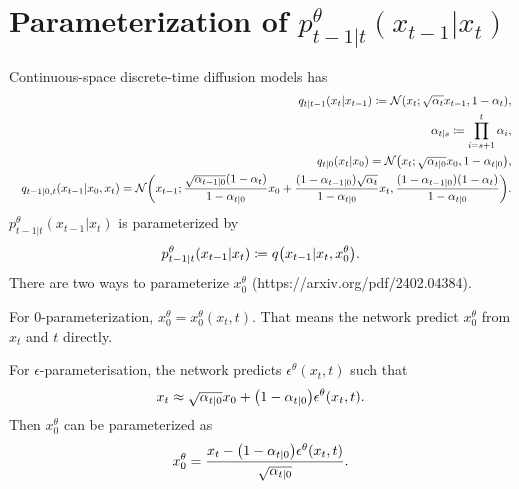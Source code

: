 \documentclass[10pt]{article}
\begin{document}
\section{Parameterization of $p^\theta_{t-1|t}(x_{t-1}|x_t)$}

Continuous-space discrete-time diffusion models has
\begin{eqnarray*}
  &&q_{t|t-1}(x_t|x_{t-1})\coloneq\mathcal{N}\qty(x_t;\sqrt{\alpha_t}x_{t-1}, 1-\alpha_t),\\
  &&\alpha_{t|s}\coloneq\prod_{i=s+1}^t \alpha_i,\\
  &&q_{t|0}(x_t|x_0)=\mathcal{N}\qty(x_t;\sqrt{\alpha_{t|0}}x_0, 1-\alpha_{t|0}),\\
  &&q_{t-1|0,t}(x_{t-1}|x_0,x_t)=\mathcal{N}\qty(x_{t-1};\frac{\sqrt{\alpha_{t-1|0}}(1-\alpha_t)}{1-\alpha_{t|0}}x_0 + \frac{(1-\alpha_{t-1|0})\sqrt{\alpha_t}}{1-\alpha_{t|0}}x_t, \frac{(1-\alpha_{t-1|0})(1-\alpha_t)}{1-\alpha_{t|0}}).
\end{eqnarray*}
$p_{t-1|t}^\theta(x_{t-1}|x_t)$ is parameterized by
\begin{eqnarray*}
  p_{t-1|t}^\theta(x_{t-1}|x_t) \coloneq q\qty(x_{t-1}|x_t, x^\theta_0).
\end{eqnarray*}
There are two ways to parameterize $x^\theta_0$ (https://arxiv.org/pdf/2402.04384). 

For $0$-parameterization, $x_0^\theta=x_0^\theta(x_t,t)$. That means the network predict $x_0^\theta$ from $x_t$ and $t$ directly.

For $\epsilon$-parameterisation, the network predicts $\epsilon^\theta(x_t,t)$ such that
\begin{eqnarray*}
  x_t\approx \sqrt{\alpha_{t|0}} x_0 + \qty(1-\alpha_{t|0}) \epsilon^\theta(x_t,t).
\end{eqnarray*}
Then $x_0^\theta$ can be parameterized as
\begin{eqnarray*}
  x^\theta_0 = \frac{x_t - \qty(1-\alpha_{t|0}) \epsilon^\theta(x_t,t)}{\sqrt{\alpha_{t|0}}}.
\end{eqnarray*}
\end{document}
